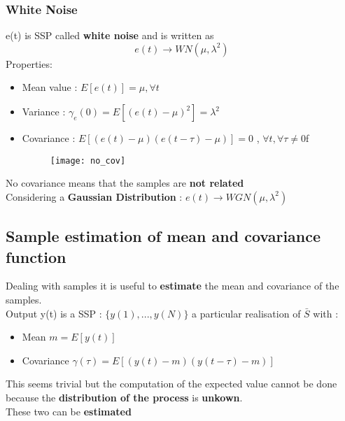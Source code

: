 \subsubsection{White Noise}
e(t) is SSP called \textbf{white noise} and is written as $$ e(t) \rightarrow WN(\mu , \lambda^2) $$
Properties: 
\begin{itemize}
\item Mean value : $ E[e(t)] = \mu , \forall t $
\item Variance : $ \gamma_e(0) = E[ (e(t)- \mu)^2] = \lambda^2 $
\item Covariance : $ E[(e(t)-\mu)(e(t-\tau)-\mu)] = 0 $ , $ \forall t, \forall \tau \neq 0 $f
\begin{figure}[!h]
  \centering
  \texttt{[image: no\_cov]}
\end{figure}
\end{itemize}
No covariance means that the samples are \textbf{not related}\\
Considering a \textbf{Gaussian Distribution}  : $ e(t) \rightarrow WGN ( \mu, \lambda^2) $

\newpage

\subsection{Sample estimation of mean and covariance function}
Dealing with samples it is useful to \textbf{estimate} the mean and covariance of the samples.\\ Output y(t) is a SSP : $ \{ y(1) ,...,y(N)\}$ a particular realisation of $ \bar{S}$ with :\\ 
\begin{itemize}
\item Mean $ m = E[y(t)]$
\item Covariance $ \gamma(\tau)= E[(y(t)-m)(y(t-\tau)-m)] $ 
\end{itemize}
This seems trivial but the computation of the expected value cannot be done because the \textbf{distribution of the process} is \textbf{unkown}.\\
These two can be \textbf{estimated}



